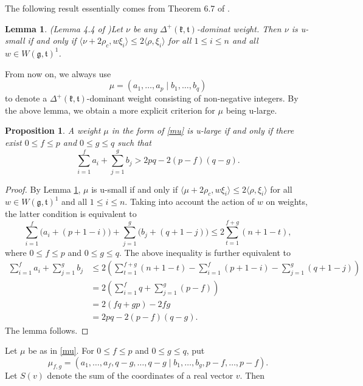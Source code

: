 \documentclass[11pt]{amsart}
\theoremstyle{plain}
\newtheorem{lemma}[thm]{Lemma}
\newtheorem{prop}[thm]{Proposition}
\theoremstyle{definition}
\newcommand{\frg}{\mathfrak{g}}
\newcommand{\frk}{\mathfrak{k}}
\newcommand{\frt}{\mathfrak{t}}
\begin{document}
The following result essentially comes from Theorem 6.7 of \cite{SV}.

\begin{lemma}\emph{(Lemma 4.4 of \cite{D20})}\label{lemma-Dong}
Let $\nu$ be any $\Delta^+(\frk, \frt)$-dominat weight. Then $\nu$ is u-small if and only if $\langle\nu+2\rho_c, w\xi_i\rangle \le 2\langle\rho, \xi_i\rangle$ for all $1\le i\le n$ and all $w\in W(\frg, \frt)^1$.
\end{lemma}

From now on, we always use
\begin{equation}\label{mu}
\mu=(a_1,\dots,a_p\mid b_1,\dots,b_q)
 \end{equation}
to denote a $\Delta^+(\frk,\frt)$-dominant weight consisting of non-negative integers.
By the above lemma, we obtain a more explicit criterion for $\mu$ being u-large.

\begin{prop}\label{prop-u-large}
	A weight $\mu$ in the form of \eqref{mu} is u-large if and only if there exist $0\le f\le p$ and $0\le g\le q$ such that
\begin{equation}\label{eq4}
\sum_{i=1}^f a_i+\sum_{j=1}^g b_j>2pq-2(p-f)(q-g).
\end{equation}
\end{prop}
\begin{proof}
	By Lemma \ref{lemma-Dong}, $\mu$ is u-small if and only if $\langle\mu + 2\rho_c, w\xi_i\rangle \le 2\langle\rho,\xi_i\rangle$ for all $w\in W(\frg, \frt)^1$ and all $1\leq i\leq n$. Taking into account the action of $w$ on weights, the latter condition is equivalent to
	\[\sum_{i=1}^f \big(a_i+(p+1-i)\big)+\sum_{j=1}^g \big(b_j+(q+1-j)\big)\le 2\sum_{t=1}^{f+g}(n+1-t),\]
	where $0\le f\le p$ and $0\le g\le q$. The above inequality is further equivalent to
	\begin{align*}
		\sum_{i=1}^f a_i+\sum_{j=1}^g b_j&\le  2\left(\sum_{t=1}^{f+g}(n+1-t)-\sum_{i=1}^f (p+1-i)-\sum_{j=1}^g (q+1-j)\right)\\
		&=2\left(\sum_{i=1}^f q+\sum_{j=1}^g (p-f)\right)\\
        &=2(fq+gp)-2fg\\
        &=2pq-2(p-f)(q-g).
	\end{align*}
	The lemma follows.
\end{proof}

Let $\mu$ be as in \eqref{mu}.
For $0\le f\le p$ and $0\le g\le q$, put
\begin{equation}\label{mufg}
\mu_{f, g}=(a_1,\dots,a_f, q-g, \dots, q-g \mid b_1,\dots,b_g, p-f, \dots, p-f).
\end{equation}
Let $S(v)$ denote the sum of the coordinates of a real vector $v$. Then
\end{document}
